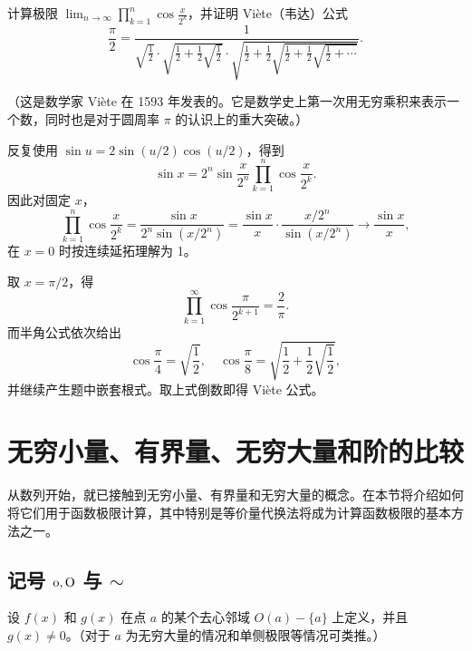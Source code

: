 \begin{xexercise}[5]
计算极限 $\displaystyle\lim_{n\to\infty}\prod_{k=1}^n\cos\frac{x}{2^k}$，并证明 Viète（韦达）公式
  \[
    \frac\pi2=
    \frac{1}{
      \sqrt{\frac12}\cdot
      \sqrt{\frac12+\frac12\sqrt{\frac12}}\cdot
      \sqrt{\frac12+\frac12\sqrt{\frac12+\frac12\sqrt{\frac12+\cdots}}}}
    .
  \]

  （这是数学家 Viète 在 1593 年发表的。它是数学史上第一次用无穷乘积来表示一个数，同时也是对于圆周率 $\pi$ 的认识上的重大突破。）
\end{xexercise}
\begin{xsolution}
反复使用 $\sin u=2\sin(u/2)\cos(u/2)$，得到
\[
  \sin x=2^n\sin\frac{x}{2^n}\prod_{k=1}^n\cos\frac{x}{2^k}.
\]
因此对固定 $x$，
\[
  \prod_{k=1}^n\cos\frac{x}{2^k}
  =\frac{\sin x}{2^n\sin(x/2^n)}
  =\frac{\sin x}{x}\cdot\frac{x/2^n}{\sin(x/2^n)}
  \to\frac{\sin x}{x},
\]
在 $x=0$ 时按连续延拓理解为 1。

取 $x=\pi/2$，得
\[
  \prod_{k=1}^{\infty}\cos\frac{\pi}{2^{k+1}}=\frac2\pi.
\]
而半角公式依次给出
\[
  \cos\frac\pi4=\sqrt{\frac12},
  \quad
  \cos\frac\pi8=\sqrt{\frac12+\frac12\sqrt{\frac12}},
\]
并继续产生题中嵌套根式。取上式倒数即得 Viète 公式。
\end{xsolution}


\section{无穷小量、有界量、无穷大量和阶的比较}

从数列开始，就已接触到无穷小量、有界量和无穷大量的概念。在本节将介绍如何将它们用于函数极限计算，其中特别是等价量代换法将成为计算函数极限的基本方法之一。

\subsection{\texorpdfstring{记号 $\mathrm{o},\mathrm{O}$ 与 $\sim$}{记号 o、O 与渐近等价}}

设 $f(x)$ 和 $g(x)$ 在点 $a$ 的某个去心邻域 $O(a)-\{a\}$ 上定义，并且 $g(x)\ne0$。（对于 $a$ 为无穷大量的情况和单侧极限等情况可类推。）

